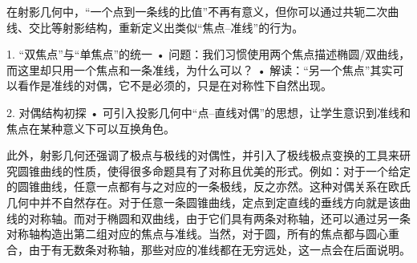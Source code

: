 在射影几何中，“一个点到一条线的比值”不再有意义，但你可以通过共轭二次曲线、交比等射影结构，重新定义出类似“焦点–准线”的行为。

1. “双焦点”与“单焦点”的统一
	•	问题：我们习惯使用两个焦点描述椭圆/双曲线，而这里却只用一个焦点和一条准线，为什么可以？
	•	解读：“另一个焦点”其实可以看作是准线的对偶，它不是必须的，只是在对称性下自然出现。

2. 对偶结构初探
	•	可引入投影几何中“点–直线对偶”的思想，让学生意识到准线和焦点在某种意义下可以互换角色。

此外，射影几何还强调了极点与极线的对偶性，并引入了极线极点变换的工具来研究圆锥曲线的性质，使得很多命题具有了对称且优美的形式。例如：对于一个给定的圆锥曲线，任意一点都有与之对应的一条极线，反之亦然。这种对偶关系在欧氏几何中并不自然存在。对于任意一条圆锥曲线，定点到定直线的垂线方向就是该曲线的对称轴。而对于椭圆和双曲线，由于它们具有两条对称轴，还可以通过另一条对称轴构造出第二组对应的焦点与准线。当然，对于圆，所有的焦点都与圆心重合，由于有无数条对称轴，那些对应的准线都在无穷远处，这一点会在后面说明。